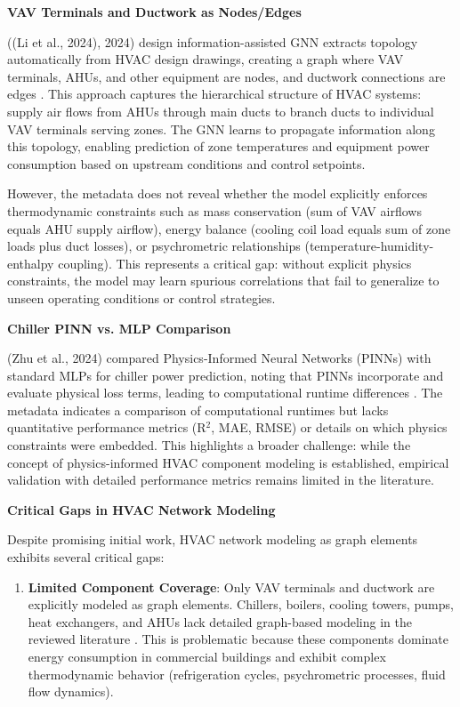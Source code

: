 \documentclass[12pt,a4paper]{article}
\begin{document}
\textbf{VAV Terminals and Ductwork as Nodes/Edges}

((Li et al., 2024), 2024) design information-assisted GNN extracts topology automatically from HVAC design drawings, creating a graph where VAV terminals, AHUs, and other equipment are nodes, and ductwork connections are edges \cite{ref32}. This approach captures the hierarchical structure of HVAC systems: supply air flows from AHUs through main ducts to branch ducts to individual VAV terminals serving zones. The GNN learns to propagate information along this topology, enabling prediction of zone temperatures and equipment power consumption based on upstream conditions and control setpoints.

However, the metadata does not reveal whether the model explicitly enforces thermodynamic constraints such as mass conservation (sum of VAV airflows equals AHU supply airflow), energy balance (cooling coil load equals sum of zone loads plus duct losses), or psychrometric relationships (temperature-humidity-enthalpy coupling). This represents a critical gap: without explicit physics constraints, the model may learn spurious correlations that fail to generalize to unseen operating conditions or control strategies.

\textbf{Chiller PINN vs. MLP Comparison}

(Zhu et al., 2024) compared Physics-Informed Neural Networks (PINNs) with standard MLPs for chiller power prediction, noting that PINNs incorporate and evaluate physical loss terms, leading to computational runtime differences \cite{ref34}. The metadata indicates a comparison of computational runtimes but lacks quantitative performance metrics (R$^2$, MAE, RMSE) or details on which physics constraints were embedded. This highlights a broader challenge: while the concept of physics-informed HVAC component modeling is established, empirical validation with detailed performance metrics remains limited in the literature.

\textbf{Critical Gaps in HVAC Network Modeling}

Despite promising initial work, HVAC network modeling as graph elements exhibits several critical gaps:

\begin{enumerate}
  \item \textbf{Limited Component Coverage}: Only VAV terminals and ductwork are explicitly modeled as graph elements. Chillers, boilers, cooling towers, pumps, heat exchangers, and AHUs lack detailed graph-based modeling in the reviewed literature \cite{ref35}. This is problematic because these components dominate energy consumption in commercial buildings and exhibit complex thermodynamic behavior (refrigeration cycles, psychrometric processes, fluid flow dynamics).
\end{enumerate}
\end{document}

